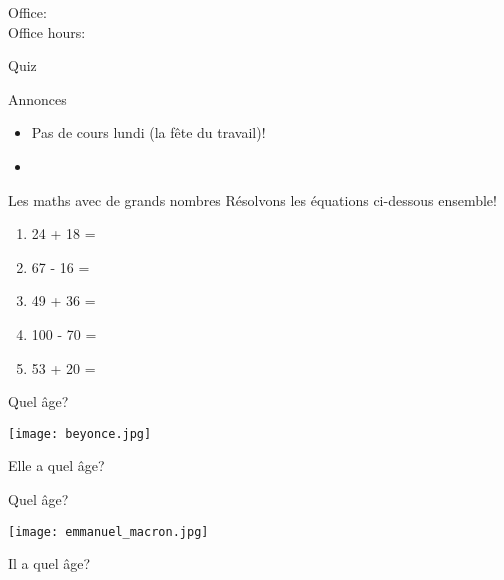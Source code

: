 \documentclass{beamer}
\subtitle[Grands nombres et adjectifs invariables]{Les grands nombres et les adjectifs invariables}
\begin{document}
  \begin{frame}
    \titlepage
    \tiny{Office: \\
          Office hours: }
  \end{frame}

  \begin{frame}{}
    \begin{center}
      \Large Quiz
    \end{center}
  \end{frame}

  \begin{frame}{Annonces}
    \begin{itemize}
      \item Pas de cours lundi (la fête du travail)!
      \item {}
    \end{itemize}
  \end{frame}

  \begin{frame}{Les maths avec de grands nombres}
    Résolvons les équations ci-dessous ensemble! \\
    \begin{enumerate}
      \item 24 + 18 = 
      \item 67 - 16 = 
      \item 49 + 36 = 
      \item 100 - 70 = 
      \item 53 + 20 = 
    \end{enumerate}
  \end{frame}

  \begin{frame}{Quel âge?}
    \begin{center}
      \texttt{[image: beyonce.jpg]}

      Elle a quel âge? \underline{} \\
    \end{center}
  \end{frame}

  \begin{frame}{Quel âge?}
    \begin{center}
      \texttt{[image: emmanuel\_macron.jpg]}

      Il a quel âge? \underline{} \\
    \end{center}
  \end{frame}
\end{document}
